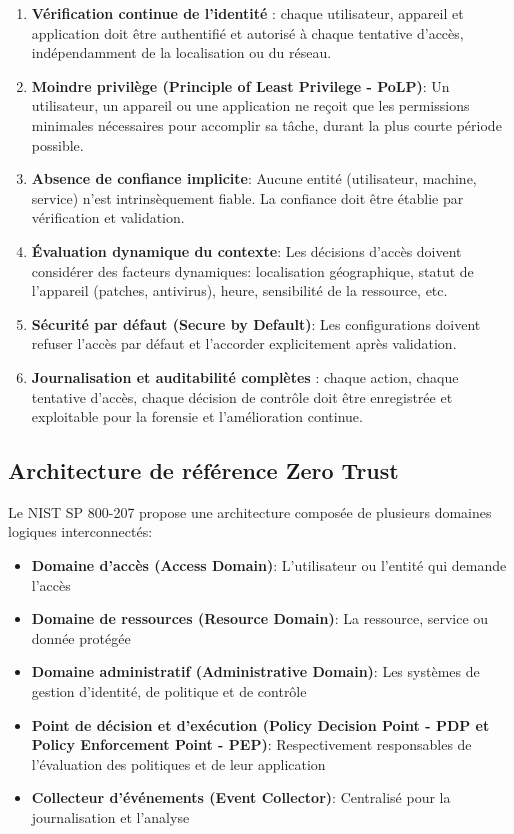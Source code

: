 \begin{enumerate}
    \item \textbf{Vérification continue de l'identité} : chaque utilisateur, appareil et application doit être authentifié et autorisé à chaque tentative d'accès, indépendamment de la localisation ou du réseau.
    
    \item \textbf{Moindre privilège (Principle of Least Privilege - PoLP)}: Un utilisateur, un appareil ou une application ne reçoit que les permissions minimales nécessaires pour accomplir sa tâche, durant la plus courte période possible.
    
    \item \textbf{Absence de confiance implicite}: Aucune entité (utilisateur, machine, service) n'est intrinsèquement fiable. La confiance doit être établie par vérification et validation.
    
    \item \textbf{Évaluation dynamique du contexte}: Les décisions d'accès doivent considérer des facteurs dynamiques: localisation géographique, statut de l'appareil (patches, antivirus), heure, sensibilité de la ressource, etc.
    
    \item \textbf{Sécurité par défaut (Secure by Default)}: Les configurations doivent refuser l'accès par défaut et l'accorder explicitement après validation.
    
    \item \textbf{Journalisation et auditabilité complètes} : chaque action, chaque tentative d'accès, chaque décision de contrôle doit être enregistrée et exploitable pour la forensie et l'amélioration continue.
\end{enumerate}

\subsection{Architecture de référence Zero Trust}

Le NIST SP 800-207 propose une architecture composée de plusieurs domaines logiques interconnectés:

\begin{itemize}
    \item \textbf{Domaine d'accès (Access Domain)}: L'utilisateur ou l'entité qui demande l'accès
    \item \textbf{Domaine de ressources (Resource Domain)}: La ressource, service ou donnée protégée
    \item \textbf{Domaine administratif (Administrative Domain)}: Les systèmes de gestion d'identité, de politique et de contrôle
    \item \textbf{Point de décision et d'exécution (Policy Decision Point - PDP et Policy Enforcement Point - PEP)}: Respectivement responsables de l'évaluation des politiques et de leur application
    \item \textbf{Collecteur d'événements (Event Collector)}: Centralisé pour la journalisation et l'analyse
\end{itemize}

